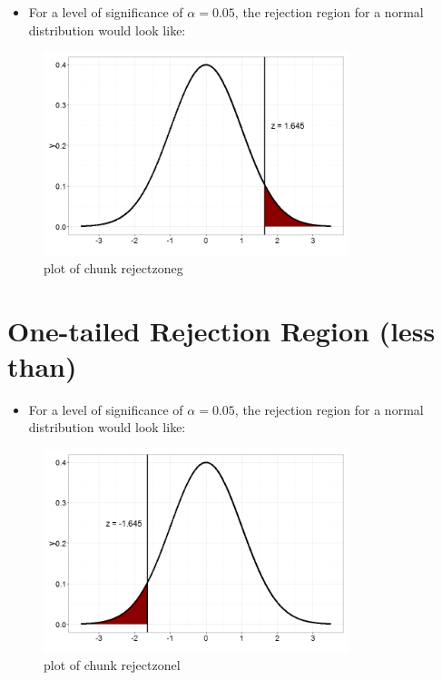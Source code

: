 \documentclass[12pt]{article}
\begin{document}
\begin{itemize}
\itemsep1pt\parskip0pt
\item
  For a level of significance of \(\alpha = 0.05\), the rejection region
  for a normal distribution would look like:
\end{itemize}

\begin{figure}[H]
\centering
\includegraphics[width=3.5in]{figure/rejectzoneg-1.png}
\caption{plot of chunk rejectzoneg}
\end{figure}

\section{One-tailed Rejection Region (less
than)}\label{one-tailed-rejection-region-less-than}

\begin{itemize}
\itemsep1pt\parskip0pt
\item
  For a level of significance of \(\alpha = 0.05\), the rejection region
  for a normal distribution would look like:
\end{itemize}

\begin{figure}[H]
\centering
\includegraphics[width=3.5in]{figure/rejectzonel-1.png}
\caption{plot of chunk rejectzonel}
\end{figure}
\end{document}
